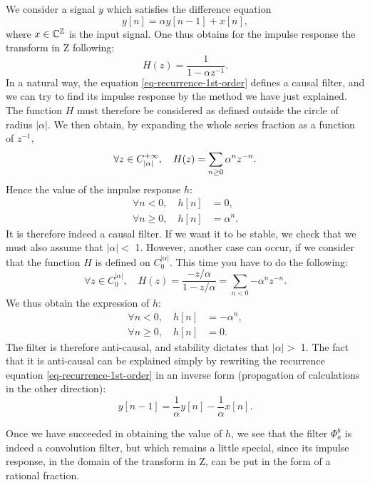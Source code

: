 \begin{exmp}
  We consider a signal $ y $ which satisfies the difference equation
\begin{equation}
\label{eq-recurrence-1st-order}
y [n] = \alpha y [n-1] + x [n],
\end{equation}
where $ x \in \mathbb{C}^{\mathbb{Z}} $ is the input signal. One thus obtains for the impulse response the transform in Z following:
\begin{equation*}
H (z) = \frac{1}{1 - \alpha z^{-1}}.
\end{equation*}
In a natural way, the equation \eqref{eq-recurrence-1st-order} defines a causal filter, and we can try to find its impulse response by the method we have just explained. The function $ H $ must therefore be considered as defined outside the circle of radius $ | \alpha | $. We then obtain, by expanding the whole series fraction as a function of $ z^{-1} $,
\begin{equation*}
\forall z \in C_{| \alpha |}^{+\infty}, \quad H (z) = \sum_{n \geq 0}{\alpha^nz^{- n}}.
\end{equation*}
Hence the value of the impulse response $ h $:
\begin{equation*}
\begin{split}
\forall n <0, \quad h [n] & = 0, \\
\forall n \geq 0, \quad h [n] & = \alpha^n.
\end{split}
\end{equation*}
It is therefore indeed a causal filter. If we want it to be stable, we check that we must also assume that $ | \alpha | <$ 1. However, another case can occur, if we consider that the function $ H $ is defined on $ C_0^{| \alpha |} $. This time you have to do the following:
\begin{equation*}
\forall z \in C_{0}^{| \alpha |}, \quad H (z) = \frac{- z / \alpha}{1 - z / \alpha} = \sum_{n <0}{- \alpha^nz^{- n}}.
\end{equation*}
We thus obtain the expression of $ h $:
\begin{equation*}
\begin{split}
\forall n <0, \quad h [n] & = - \alpha^n, \\
\forall n \geq 0, \quad h [n] & = 0.
\end{split}
\end{equation*}
The filter is therefore anti-causal, and stability dictates that $ | \alpha | > $ 1. The fact that it is anti-causal can be explained simply by rewriting the recurrence equation \eqref{eq-recurrence-1st-order} in an inverse form (propagation of calculations in the other direction):
\begin{equation*}
y [n-1] = \frac{1}{\alpha} y [n] - \frac{1}{\alpha} x [n].
\end{equation*}
\end{exmp}
Once we have succeeded in obtaining the value of $ h $, we see that the filter $ \Phi_a^b $ is indeed a convolution filter, but which remains a little special, since its impulse response, in the domain of the transform in Z, can be put in the form of a rational fraction.
 
